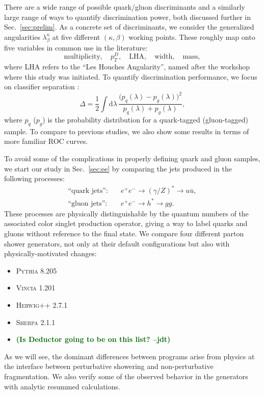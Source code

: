 \documentclass[11pt,letterpaper]{article}
\newcommand{\df}{\text{d}}
\DeclareRobustCommand{\Sec}[1]{Sec.~\ref{#1}}
\newcommand{\be}{\begin{equation}}
\newcommand{\ee}{\end{equation}}
\newcommand{\jdt}[1]{\textbf{\textcolor{darkgreen}{(#1 --jdt)}}}
\begin{document}
There are a wide range of possible quark/gluon discriminants and a similarly large range of ways to quantify discrimination power, both discussed further in  \Sec{sec:prelim}.  As a concrete set of discriminants, we consider the generalized angularities $\lambda_\beta^\kappa$ \cite{} at five different $(\kappa, \beta)$ working points.  These roughly map onto five variables in common use in the literature:
\be
\text{multiplicity}, \quad p_T^D, \quad \text{LHA}, \quad \text{width}, \quad \text{mass},
\ee
where LHA refers to the ``Les Houches Angularity'', named after the workshop where this study was initiated.  To quantify discrimination performance, we focus on classifier separation \cite{}:
\be
\Delta =  \frac{1}{2} \int \df \lambda \, \frac{\bigl(p_q(\lambda) - p_g(\lambda)\bigr)^2}{p_q(\lambda) + p_g(\lambda)},
\ee
where $p_q$ ($p_g$) is the probability distribution for a quark-tagged (gluon-tagged) sample.   To compare to previous studies, we also show some results in terms of more familiar ROC curves.

To avoid some of the complications in properly defining quark and gluon samples, we start our study in \Sec{sec:ee} by comparing the jets produced in the following processes:
\begin{align}
\text{``quark jets''}: \quad & e^+e^- \to (\gamma/Z)^* \to u \overline{u}, \\
\text{``gluon jets''}: \quad & e^+e^- \to h^* \to g g.
\end{align}
These processes are physically distinguishable by the quantum numbers of the associated color singlet production operator, giving a way to label quarks and gluons without reference to the final state.  We compare four different parton shower generators, not only at their default configurations but also with physically-motivated changes:
\begin{itemize}
\item \textsc{Pythia 8.205} \cite{}
\item \textsc{Vincia 1.201} \cite{}
\item \textsc{Herwig++ 2.7.1} \cite{}
\item \textsc{Sherpa 2.1.1} \cite{}
\item \jdt{Is Deductor going to be on this list?}
\end{itemize}
As we will see, the dominant differences between programs arise from physics at the interface between perturbative showering and non-perturbative fragmentation.  We also verify some of the observed behavior in the generators with analytic resummed calculations.
\end{document}
